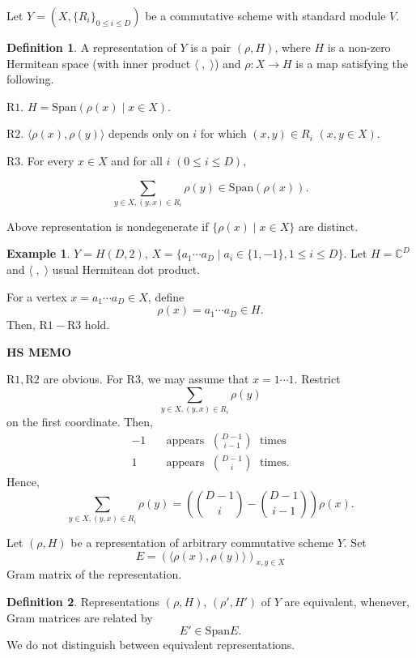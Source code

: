 \documentclass[
]{book}
\theoremstyle{definition}
\newtheorem{definition}{Definition}[chapter]
\theoremstyle{definition}
\newtheorem{example}{Example}[chapter]
\theoremstyle{definition}
\theoremstyle{definition}
\theoremstyle{remark}
\begin{document}
Let \(Y = (X, \{R_i\}_{0\leq i\leq D})\) be a commutative scheme with standard module \(V\).

\begin{definition}
\protect\hypertarget{def:representation-of-y}{}\label{def:representation-of-y}A representation of \(Y\) is a pair \((\rho, H)\), where \(H\) is a non-zero Hermitean space (with inner product \(\langle \;, \;\rangle\)) and
\(\rho: X\to H\) is a map satisfying the following.

\(\mathrm{R1}\). \(H = \mathrm{Span}(\rho(x)\mid x\in X)\).

\(\mathrm{R2}\). \(\langle \rho(x), \rho(y)\rangle\) depends only on \(i\) for which \((x,y)\in R_i\) \((x,y\in X)\).

\(\mathrm{R3}\). For every \(x\in X\) and for all \(i\) \((0\leq i\leq D)\),

\[\sum_{y\in X, (y,x)\in R_i}\rho(y)\in \mathrm{Span}(\rho(x)).\]

Above representation is nondegenerate if \(\{\rho(x)\mid x\in X\}\) are distinct.
\end{definition}

\begin{example}
\protect\hypertarget{exm:representation-of-hd2}{}\label{exm:representation-of-hd2}\(Y = H(D,2)\), \(X = \{a_1\cdots a_D\mid a_i\in \{1,-1\}, 1\leq i\leq D\}\).
Let \(H = \mathbb{C}^D\) and \(\langle \;, \;\rangle\) usual Hermitean dot product.

For a vertex \(x = a_1\cdots a_D\in X\), define
\[\rho(x) = a_1\cdots a_D\in H.\]
Then, \(\mathrm{R1}-\mathrm{R3}\) hold.
\end{example}

\textbf{HS MEMO}

\(\mathrm{R1}, \mathrm{R2}\) are obvious.
For \(\mathrm{R3}\), we may assume that \(x = 1\cdots 1\).
Restrict
\[\sum_{y\in X, (y,x)\in R_i}\rho(y)\]
on the first coordinate. Then,
\begin{align}
-1 & \quad \text{appears }\; \binom{D-1}{i-1} \;\text{ times}\\
1 & \quad \text{appears } \;\binom{D-1}{i} \;\text{ times}.
\end{align}
Hence,
\[\sum_{y\in X, (y,x)\in R_i}\rho(y) = \left(\binom{D-1}{i} - \binom{D-1}{i-1}\right)\rho(x).\]

Let \((\rho, H)\) be a representation of arbitrary commutative scheme \(Y\). Set
\[E = (\langle \rho(x),\rho(y)\rangle)_{x,y\in X}\]
Gram matrix of the representation.

\begin{definition}
\protect\hypertarget{def:equivalence-of-representation}{}\label{def:equivalence-of-representation}Representations \((\rho, H)\), \((\rho', H')\) of \(Y\) are equivalent, whenever, Gram matrices are related by
\[E'\in \mathrm{Span} E.\]
We do not distinguish between equivalent representations.
\end{definition}
\end{document}
